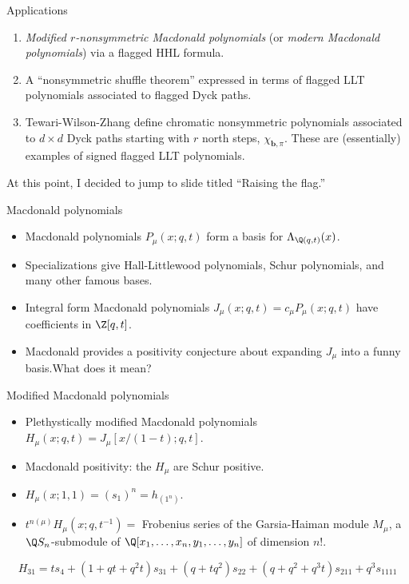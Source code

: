 \documentclass[dvipsnames]{beamer}
\newcommand{\xx}{x}%
\newcommand{\Gcal}{{\mathcal G}}
\newcommand{\bb}{{\mathbf b}}
\theoremstyle{definition}
\newcounter{c}
\begin{document}
\begin{frame}{Applications}
  \begin{enumerate}
  \item \emph{Modified \(r\)-nonsymmetric Macdonald
      polynomials} (or \emph{modern Macdonald polynomials})
    via a flagged HHL formula.\pause
  \item A ``nonsymmetric shuffle theorem''
    expressed in terms of flagged LLT polynomials associated to
    flagged Dyck paths.\pause
  \item Tewari-Wilson-Zhang define chromatic nonsymmetric polynomials
    associated to \(d \times d\) Dyck paths starting with \(r\) north
    steps, \(\chi_{\bb,\pi}\). These are (essentially) examples of signed
    flagged LLT polynomials.
  \end{enumerate}
\end{frame}
\begin{frame}
  At this point, I decided to jump to slide titled ``Raising the flag.''
\end{frame}
\begin{frame}{Macdonald polynomials}
  \begin{itemize}
\item Macdonald polynomials  $P_\mu(\xx;q,t)$ form a basis for  $\Lambda_{\Q(q,t)}(\xx)$.\pause
\item Specializations give Hall-Littlewood polynomials, Schur
  polynomials, and many other famous bases.\pause
\item Integral form Macdonald polynomials $J_{\mu}(\xx;q, t) = c_\mu P_\mu(\xx;q,t)$ have coefficients in  $\Z[q,t]$.\pause
\item Macdonald provides a positivity conjecture about expanding
  \(J_\mu\) into a funny basis.\pause What does it mean?
\end{itemize}
\end{frame}
\begin{frame}{Modified Macdonald polynomials}
\begin{itemize}
\item Plethystically modified Macdonald polynomials
\mbox{\quad \quad \quad \quad \quad \quad \quad $H_\mu(\xx;q,t) = J_\mu[\xx/(1-t);q,t]$.}
\item Macdonald positivity: the  $H_\mu$ are Schur positive.\pause
\item $H_\mu(\xx;1,1) = (s_1)^n = h_{(1^n)}$.\pause
\item $t^{n(\mu)} H_\mu(\xx;q,t^{-1}) = $ Frobenius series of the
Garsia-Haiman module  $M_\mu$, a $\Q S_n$-submodule of
 $\Q[x_1,\dots, x_n, y_1,\dots, y_n]$ of dimension  $n!$.\pause
\end{itemize}
\vspace{0.5cm}
\[
H_{31} = ts_4 + (1+qt+q^2t)s_{31} + (q+tq^2)s_{22}+(q+q^2+q^3t)s_{211}+q^3s_{1111}
\]
\end{frame}
\end{document}
